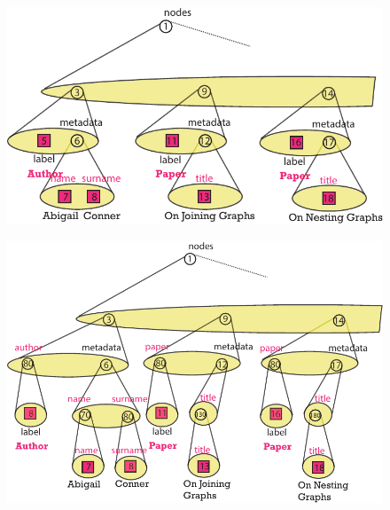 \begin{figure}[!ph]
\centering
\begin{minipage}[t]{0.9\textwidth}
	\centering
	\includegraphics[scale=0.8]{fig/05language/10rearranged_input.pdf}
	\label{fig:nestingexamples}
\end{minipage}
\begin{minipage}[t]{0.9\textwidth}
	\centering
	\includegraphics[scale=0.8]{fig/05language/11preserving_aggregation.pdf}
	\label{fig:firstexample}
\end{minipage}
\begin{minipage}[t]{0.9\textwidth}
	\centering

\end{minipage}
\end{figure}
